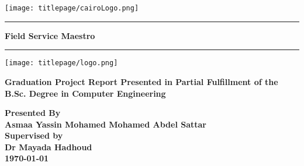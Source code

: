 \documentclass[12pt,a4paper]{report}
\begin{document}
\newcommand{\HRule}{\rule{\linewidth}{0.5mm}}
\begin{titlepage}
	\begin{center}
			\centering
			\texttt{[image: titlepage/cairoLogo.png]}

		\Huge
		\HRule
		
		\textbf{Field Service Maestro}
		\HRule
		
		\vspace*{0.5cm}
		\centering
		\texttt{[image: titlepage/logo.png]}
		
		\vspace*{.5cm}
		\Large
		\textbf{ Graduation Project Report Presented in
Partial Fulfillment of the B.Sc. Degree in Computer Engineering}

		\large
		\vspace*{1.5cm}
		{\textbf{Presented By}}\\
		\Large \textbf{
		{Asmaa Yassin Mohamed}
		\hfill
		{Mohamed Abdel Sattar}\\
		}
		\vspace*{1.5cm}
		{\textbf {\large Supervised by}}\\
		\textbf{\LARGE Dr Mayada Hadhoud}\\
		\vfill
		{\textbf{\today}}
	\end{center}
\end{titlepage}
\end{document}
